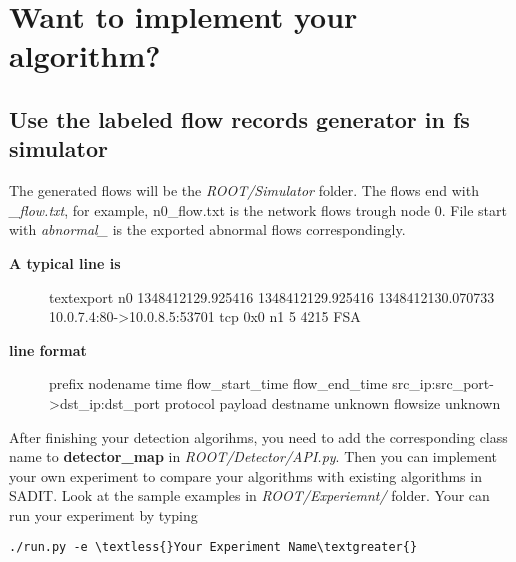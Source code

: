 \documentclass[letterpaper,10pt,english]{sphinxmanual}
\begin{document}
\chapter{Want to implement your algorithm?}
\label{index:want-to-implement-your-algorithm}

\section{Use the labeled flow records generator in fs simulator}
\label{index:use-the-labeled-flow-records-generator-in-fs-simulator}
The generated flows will be the \emph{ROOT/Simulator} folder. The flows end with
\emph{\_flow.txt}, for example, n0\_flow.txt is the network flows trough node 0. File
start with \emph{abnormal\_} is the exported abnormal flows correspondingly.
\begin{description}
\item[{\textbf{A typical line is}}] \leavevmode
textexport n0 1348412129.925416 1348412129.925416 1348412130.070733 10.0.7.4:80-\textgreater{}10.0.8.5:53701 tcp 0x0 n1 5 4215 FSA

\item[{\textbf{line format}}] \leavevmode
prefix nodename time flow\_start\_time flow\_end\_time src\_ip:src\_port-\textgreater{}dst\_ip:dst\_port protocol payload destname unknown flowsize unknown

\end{description}

After finishing your detection algorihms, you need to add the corresponding
class name to \textbf{detector\_map} in \emph{ROOT/Detector/API.py}. Then you can implement
your own experiment to compare your algorithms with existing algorithms in
SADIT. Look at the sample examples in  \emph{ROOT/Experiemnt/} folder. Your can run
your experiment by typing

\begin{Verbatim}[commandchars=\\\{\}]
./run.py -e \textless{}Your Experiment Name\textgreater{}
\end{Verbatim}
\end{document}
